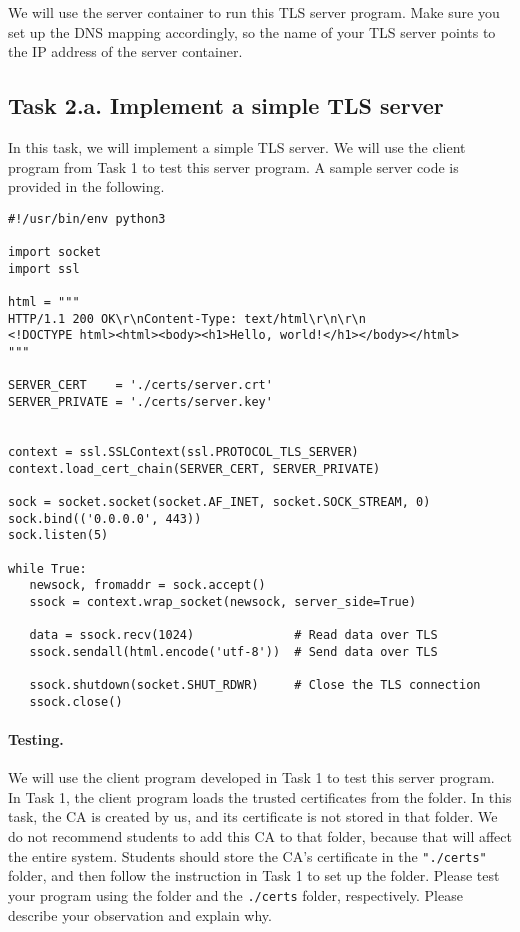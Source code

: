 We will use the server container to run this TLS server program.
Make sure you set up the DNS mapping accordingly, so 
the name of your TLS server points to the IP address of the 
server container. 




\subsection{Task 2.a. Implement a simple TLS server}

In this task, we will implement a simple TLS server. We will
use the client program from Task 1 to test this server program.
A sample server code is provided in the following.


\begin{lstlisting}[caption={\texttt{server.py} (in \texttt{Labsetup/volumes})}, label={tls:server}]
#!/usr/bin/env python3

import socket
import ssl

html = """
HTTP/1.1 200 OK\r\nContent-Type: text/html\r\n\r\n
<!DOCTYPE html><html><body><h1>Hello, world!</h1></body></html>
"""

SERVER_CERT    = './certs/server.crt'
SERVER_PRIVATE = './certs/server.key'


context = ssl.SSLContext(ssl.PROTOCOL_TLS_SERVER) 
context.load_cert_chain(SERVER_CERT, SERVER_PRIVATE)

sock = socket.socket(socket.AF_INET, socket.SOCK_STREAM, 0)
sock.bind(('0.0.0.0', 443))
sock.listen(5)

while True:
   newsock, fromaddr = sock.accept()
   ssock = context.wrap_socket(newsock, server_side=True)

   data = ssock.recv(1024)              # Read data over TLS
   ssock.sendall(html.encode('utf-8'))  # Send data over TLS

   ssock.shutdown(socket.SHUT_RDWR)     # Close the TLS connection
   ssock.close()
\end{lstlisting}
 


\paragraph{Testing.}
We will use the client program developed in Task 1 to test this 
server program.
In Task 1, the client program loads the trusted certificates from the 
 folder. 
In this task, the CA is created by us, and its
certificate is not stored in that folder. We do not recommend students 
to add this CA to that folder, because that will affect the entire 
system. Students should store the CA's certificate in 
the \texttt{"./certs"} folder, and then follow the instruction
in Task 1 to set up the folder. 
Please test your program using the  folder
and the \texttt{./certs} folder, respectively. 
Please describe your observation and explain why.



